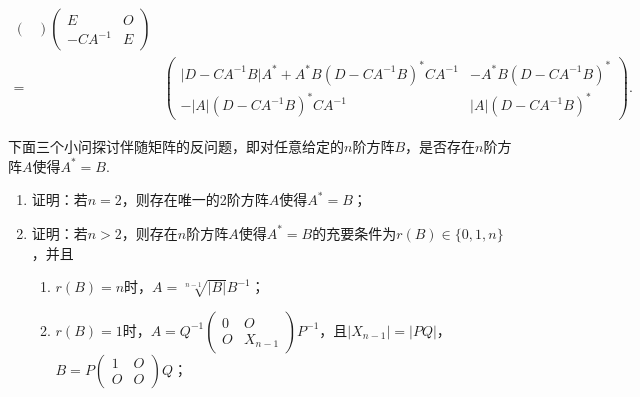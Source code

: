 \begin{exercise}
\begin{exgroup}
\begin{answer}
\begin{enumerate}
\begin{align*}
\begin{pmatrix}
                                \end{pmatrix}
                          \begin{pmatrix}
                              E        & O \\
                              -CA^{-1} & E
                          \end{pmatrix}                                                                                \\
                          ={} & \begin{pmatrix}
                                    \lvert D-CA^{-1}B \rvert A^*+A^*B(D-CA^{-1}B)^*CA^{-1} & -A^*B(D-CA^{-1}B)^*            \\
                                    -\lvert A \rvert (D-CA^{-1}B)^*CA^{-1}                 & \lvert A \rvert (D-CA^{-1}B)^*
                                \end{pmatrix}. &
                      \end{align*}
            \end{enumerate}
        \end{answer}

        \item 下面三个小问探讨伴随矩阵的反问题，即对任意给定的$n$阶方阵$B$，是否存在$n$阶方阵$A$使得$A^*=B$.
        \begin{enumerate}
            \item 证明：若$n=2$，则存在唯一的2阶方阵$A$使得$A^*=B$；

            \item 证明：若$n > 2$，则存在$n$阶方阵$A$使得$A^*=B$的充要条件为$r(B) \in \{0,1,n\}$，并且
                  \begin{enumerate}
                      \item $r(B)=n$时，$A=\sqrt[n-1]{|B|}B^{-1}$；

                      \item $r(B)=1$时，$A=Q^{-1}\begin{pmatrix}
                                    0 & O \\ O & X_{n-1}
                                \end{pmatrix}P^{-1}$，且$|X_{n-1}|=|PQ|$，$B=P\begin{pmatrix}
                                    1 & O \\ O & O
                                \end{pmatrix}Q$；
                  \end{enumerate}


\end{enumerate}
\end{exgroup}
\end{exercise}

